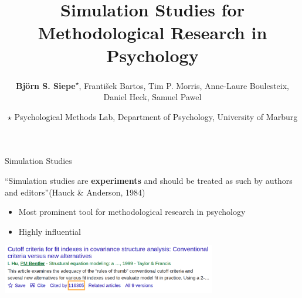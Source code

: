 \documentclass[english, 12pt, aspectratio=169]{beamer}
\date{$\star$ Psychological Methods Lab, Department of Psychology, University of Marburg}
\title{~\\ ~ \\ \textbf{Simulation Studies for Methodological Research in Psychology}}
\author{\textbf{Björn S. Siepe}\textsuperscript{$\star$}, František Bartos, Tim P. Morris, Anne-Laure Boulesteix, Daniel Heck, Samuel Pawel}
\institute{
  SIPS 2024. Slides available at \url{htpps://bsiepe.github.io}
}
\begin{document}


\begin{frame}
   \titlepage
 \nocite{PawelKookReeve2023}
 \end{frame}


\begin{frame}{Simulation Studies}
        \begin{tcolorbox}[colframe=chineseBlue]
            ``Simulation studies are \alert{\textbf{experiments}} and should be treated as such by authors and editors''(Hauck \& Anderson, 1984)
        \end{tcolorbox}
      \begin{itemize}
      \pause
        \item Most prominent tool for methodological research in psychology
        \pause
        \item Highly influential 
        \pause
      \end{itemize}
      \centering
              \includegraphics[width=0.7\textwidth,frame]{pics/hubentler.png}
              \nocite{Hauck1984}
          
\end{frame}
\end{document}
